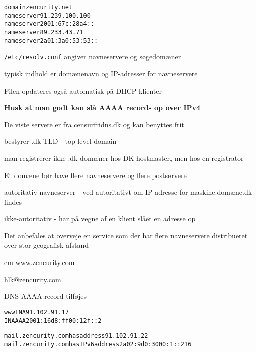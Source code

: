 \documentclass[Screen16to9,17pt]{foils}
\begin{document}

\begin{alltt}
domain zencurity.net
nameserver 91.239.100.100
nameserver 2001:67c:28a4::
nameserver 89.233.43.71
nameserver 2a01:3a0:53:53::
\end{alltt}

\begin{list1}
\item \verb+/etc/resolv.conf+ angiver navneservere og søgedomæner
\item typisk indhold er domænenavn og IP-adresser for navneservere
\item Filen opdateres også automatisk på DHCP klienter
\item {\bf Husk at man godt kan slå AAAA records op over IPv4}
\item De viste servere er fra censurfridns.dk og kan benyttes frit
\end{list1}





\begin{list1}
\item bestyrer .dk TLD - top level domain

\item man registrerer ikke .dk-domæner hos DK-hostmaster, men hos en
  registrator
\item Et domæne bør have flere navneservere og flere postservere
\item autoritativ navneserver - ved autoritativt om IP-adresse for
  maskine.domæne.dk findes
\item ikke-autoritativ - har på vegne af en klient slået en adresse op
\item Det anbefales at overveje en service som
   der har flere navneservere distribueret
  over stor geografisk afstand
\end{list1}



\begin{center}
\hlkbig
{} cm
www.zencurity.com

hlk@zencurity.com
\end{center}

DNS AAAA record tilføjes
\begin{alltt}
www     IN A    91.102.91.17
        IN AAAA 2001:16d8:ff00:12f::2

mail.zencurity.com has address 91.102.91.22
mail.zencurity.com has IPv6 address 2a02:9d0:3000:1::216
\end{alltt}
\end{document}
